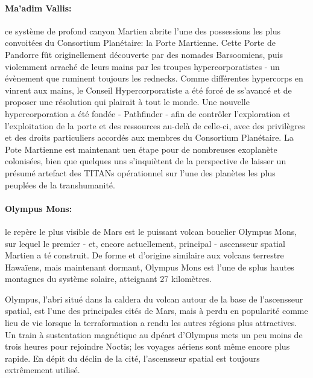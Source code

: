                                                             \paragraph{Ma'adim Vallis:} \label{sec:maadim-vallis} ce système de profond canyon Martien abrite l'une des possessions les plus convoitées du Consortium Planétaire: la Porte Martienne. Cette Porte de Pandorre fût originellement découverte par des nomades Barsoomiens, puis violemment arraché de leurs mains par les troupes hypercorporatistes - un évènement que ruminent toujours les rednecks. Comme différentes hypercorps en vinrent aux mains, le Conseil Hypercorporatiste a été forcé de ss'avancé et de proposer une résolution qui plairait à tout le monde. Une nouvelle hypercorporation a été fondée - Pathfinder - afin de contrôler l'exploration et l'exploitation de la porte et des ressources au-delà de celle-ci, avec des privilègres et des droits particuliers accordés aux membres du Consortium Planétaire. La Pote Martienne est maintenant uen étape pour de nombreuses exoplanète colonisées, bien que quelques uns s'inquiètent de la perspective de laisser un présumé artefact des TITANs opérationnel sur l'une des planètes les plus peuplées de la transhumanité. 

                                                            \paragraph{Olympus Mons:} \label{sec:olympus-mons} le repère le plus visible de Mars est le puissant volcan bouclier Olympus Mons, sur lequel le premier - et, encore actuellement, principal - ascensseur spatial Martien a té construit. De forme et d'origine similaire aux volcans terrestre Hawaïens, mais maintenant dormant, Olympus Mons est l'une de splus hautes montagnes du système solaire, atteignant 27 kilomètres. 

                                                            Olympus, l'abri situé dans la caldera du volcan autour de la base de l'ascensseur spatial, est l'une des principales cités de Mars, mais à perdu en popularité comme lieu de vie lorsque la terraformation a rendu les autres régions plus attractives. Un train à sustentation magnétique au dpéart d'Olympus mets un peu moins de trois heures pour rejoindre Noctis; les voyages aériens sont même encore plus rapide. En dépit du déclin de la cité, l'ascensseur spatial est toujours extrêmement utilisé. 


